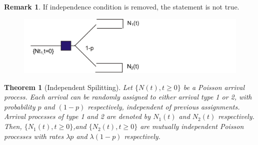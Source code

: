 \documentclass[a4paper,10pt]{article}
\theoremstyle{plain}
\newtheorem{thm}{Theorem}[section]
\theoremstyle{definition}
\newtheorem{rem}{Remark}
\begin{document}
\begin{rem}If independence condition is removed, the statement is not true.
\end{rem}
\begin{figure}
\centering
  \includegraphics[width=5.0in]{Figures/comment.PNG}\\
\end{figure}

\begin{thm}[Independent Spilitting] Let $\{N(t), t \geqslant 0\}$ be a Poisson arrival process. Each arrival can be randomly assigned to either arrival type 1 or 2, with probability $p$ and $(1-p)$ respectively, independent of previous assignments. Arrival processes of type 1 and 2 are denoted by $N_1(t)$ and $N_2(t)$ respectively. Then, $\{N_{1}(t), t \geqslant 0\}$,and $\{N_{2}(t), t \geqslant 0\}$ are mutually independent Poisson processes with rates $\lambda p$ and $\lambda (1-p)$ respectively.  
\end{thm}
\end{document}

